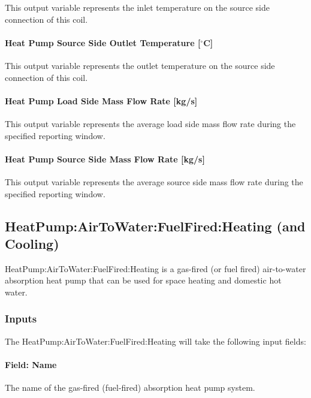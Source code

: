 This output variable represents the inlet temperature on the source side connection of this coil.

\paragraph{Heat Pump Source Side Outlet Temperature {[}$^\circ$C{]}}\label{plhp_eir_outputs_t_source_out}

This output variable represents the outlet temperature on the source side connection of this coil.

\paragraph{Heat Pump Load Side Mass Flow Rate {[}kg/s{]}}\label{plhp_eir_outputs_load_flow}

This output variable represents the average load side mass flow rate during the specified reporting window.

\paragraph{Heat Pump Source Side Mass Flow Rate {[}kg/s{]}}\label{plhp_eir_outputs_src_flow}

This output variable represents the average source side mass flow rate during the specified reporting window.

\subsection{HeatPump:AirToWater:FuelFired:Heating (and Cooling)}\label{plhp_fuelfired}

HeatPump:AirToWater:FuelFired:Heating is a gas-fired (or fuel fired) air-to-water absorption heat pump that can be used for space heating and domestic hot water. 

\subsubsection{Inputs}

The HeatPump:AirToWater:FuelFired:Heating will take the following input fields:

\paragraph{Field: Name}
The name of the gas-fired (fuel-fired) absorption heat pump system.


